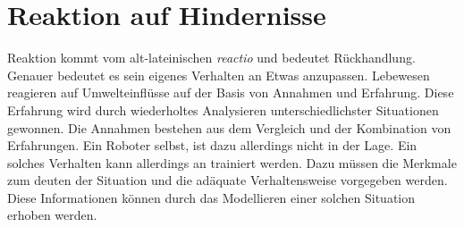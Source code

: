 \chapter{Reaktion auf Hindernisse}
Reaktion kommt vom alt-lateinischen \textit{reactio} und bedeutet Rückhandlung. Genauer bedeutet es sein eigenes Verhalten an Etwas anzupassen. Lebewesen reagieren auf Umwelteinflüsse auf der Basis von Annahmen und Erfahrung. Diese Erfahrung wird durch wiederholtes Analysieren unterschiedlichster Situationen gewonnen. Die Annahmen bestehen aus dem Vergleich und der Kombination von Erfahrungen. Ein Roboter selbst, ist dazu allerdings nicht in der Lage. Ein solches Verhalten kann allerdings an trainiert werden. Dazu müssen die Merkmale zum deuten der Situation und die adäquate Verhaltensweise vorgegeben werden. Diese Informationen können durch das Modellieren einer solchen Situation erhoben werden.

